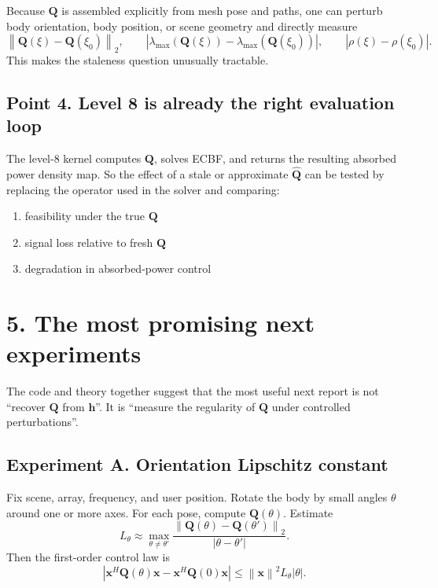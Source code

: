 \documentclass[11pt]{article}
\newcommand{\hh}{\mathbf{h}}
\newcommand{\QQ}{\mathbf{Q}}
\newcommand{\x}{\mathbf{x}}
\newcommand{\norm}[1]{\left\lVert #1 \right\rVert}
\newcommand{\abs}[1]{\left\lvert #1 \right\rvert}
\begin{document}
Because $\QQ$ is assembled explicitly from mesh pose and paths, one can perturb
body orientation, body position, or scene geometry and directly measure
\[
  \norm{\QQ(\xi)-\QQ(\xi_0)}_2,
  \qquad
  \abs{\lambda_{\max}(\QQ(\xi))-\lambda_{\max}(\QQ(\xi_0))},
  \qquad
  \abs{\rho(\xi)-\rho(\xi_0)}.
\]
This makes the staleness question unusually tractable.

\subsection*{Point 4. Level 8 is already the right evaluation loop}

The level-8 kernel computes $\QQ$, solves ECBF, and returns the resulting
absorbed power density map. So the effect of a stale or approximate
$\widehat{\QQ}$ can be tested by replacing the operator used in the solver and
comparing:
\begin{enumerate}
  \item feasibility under the true $\QQ$
  \item signal loss relative to fresh $\QQ$
  \item degradation in absorbed-power control
\end{enumerate}

\section*{5. The most promising next experiments}

The code and theory together suggest that the most useful next report is not
``recover $\QQ$ from $\hh$''. It is ``measure the regularity of $\QQ$ under
controlled perturbations''.

\subsection*{Experiment A. Orientation Lipschitz constant}

Fix scene, array, frequency, and user position. Rotate the body by small
angles $\theta$ around one or more axes. For each pose, compute
$\QQ(\theta)$. Estimate
\begin{equation}
  L_\theta \approx
  \max_{\theta\neq\theta'}
  \frac{\norm{\QQ(\theta)-\QQ(\theta')}_2}{\abs{\theta-\theta'}}.
\end{equation}
Then the first-order control law is
\begin{equation}
  \abs{\x^H\QQ(\theta)\x-\x^H\QQ(0)\x}
  \le \norm{\x}^2 L_\theta \abs{\theta}.
\end{equation}
\end{document}
